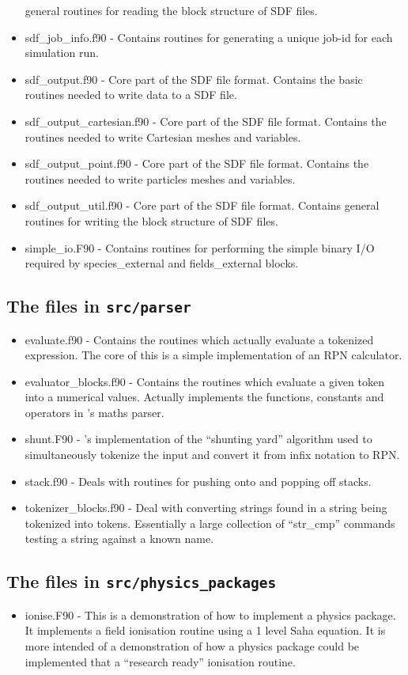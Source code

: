 \documentclass[12pt,a4paper]{article}
\newcommand{\inlinecode}[1]{{\color{warwickred} \bf\texttt{#1}}}
\newcommand{\EPOCH}{{\color{warwickdark}\fontfamily{phv}\selectfont{EPOCH}}}
\begin{document}
\begin{itemize}
  general routines for reading the block structure of SDF files.
\item sdf\_job\_info.f90 - Contains routines for generating a unique job-id for
  each simulation run.
\item sdf\_output.f90 - Core part of the SDF file format. Contains the basic
  routines needed to write data to a SDF file.
\item sdf\_output\_cartesian.f90 - Core part of the SDF file format. Contains
  the routines needed to write Cartesian meshes and variables.
\item sdf\_output\_point.f90 - Core part of the SDF file format. Contains the
  routines needed to write particles meshes and variables.
\item sdf\_output\_util.f90 - Core part of the SDF file format. Contains
  general routines for writing the block structure of SDF files.
\item simple\_io.F90 - Contains routines for performing the simple binary I/O
  required by species\_external and fields\_external blocks.
\end{itemize}

\subsection{The files in \inlinecode{src/parser}}
\begin{itemize}
\item evaluate.f90 - Contains the routines which actually evaluate a tokenized
  expression. The core of this is a simple implementation of an RPN
  calculator.
\item evaluator\_blocks.f90 - Contains the routines which evaluate a given
  token into a numerical values. Actually implements the functions, constants
  and operators in {\EPOCH}'s maths parser.
\item shunt.F90 - {\EPOCH}'s implementation of the ``shunting yard'' algorithm
  used to simultaneously tokenize the input and convert it from infix notation
  to RPN.
\item stack.f90 - Deals with routines for pushing onto and popping off
  stacks.
\item tokenizer\_blocks.f90 - Deal with converting strings found in a string
  being tokenized into tokens. Essentially a large collection of ``str\_cmp''
  commands testing a string against a known name.
\end{itemize}

\subsection{The files in \inlinecode{src/physics\_packages}}
\begin{itemize}
\item ionise.F90 - This is a demonstration of how to implement a physics
  package. It implements a field ionisation routine using a 1 level Saha
  equation. It is more intended of a demonstration of how a physics package
  could be implemented that a ``research ready'' ionisation routine.
\end{itemize}
\end{document}
